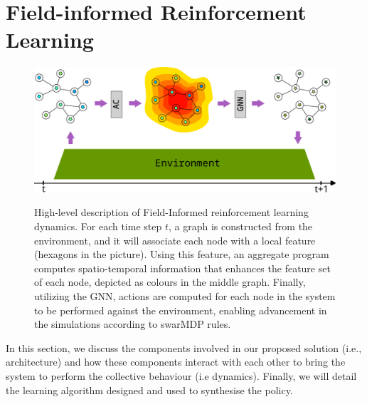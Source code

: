 \documentclass[conference]{IEEEtran}
\begin{document}
\section{Field-informed Reinforcement Learning}
\label{sec:approach}
\begin{figure}
  \includegraphics[width=\linewidth]{imgs/architecture.pdf}
  \label{fig:architecture}
  \caption{High-level description of Field-Informed reinforcement learning dynamics. 
  For each time step $t$, a graph is constructed from the environment, and it will associate each node with a local feature (hexagons in the picture). 
  Using this feature, an aggregate program computes spatio-temporal information that enhances the feature set of each node, depicted as colours in the middle graph. 
  Finally, utilizing the GNN, actions are computed for each node in the system to be performed against the environment, enabling advancement in the simulations according to swarMDP rules.
}
\end{figure}
In this section, we discuss the components involved in our proposed solution (i.e., architecture) and how these components interact with each other to bring the system to perform the collective behaviour (i.e dynamics). Finally, we will detail the learning algorithm designed and used to synthesise the policy.
\end{document}
